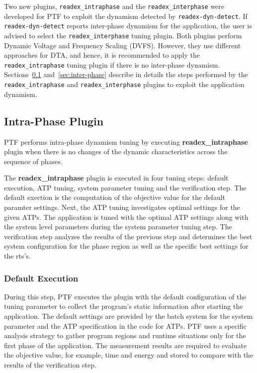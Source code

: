Two new plugins, \texttt{readex\_intraphase} and the \texttt{readex\_interphase} were developed for PTF to exploit the dynamism detected by \texttt{readex-dyn-detect}. If \texttt{readex-dyn-detect} reports inter-phase dynamism for the application, the user is advised to select the \texttt{readex\_interphase} tuning plugin. Both plugins perform Dynamic Voltage and Frequency Scaling (DVFS). However, they use different approaches for DTA, and hence, it is recommended to apply the \texttt{readex\_intraphase} tuning plugin if there is no inter-phase dynamism. Sections~\ref{sec:intra-phase} and~\ref{sec:inter-phase} describe in details the steps performed by the \texttt{readex\_intraphase} and \texttt{readex\_interphase} plugins to exploit the application dynamism.


\subsection{Intra-Phase Plugin} \label{sec:intra-phase}

PTF performs intra-phase dynamism tuning by executing \textbf{readex\_intraphase} plugin when there is no changes of the dynamic characteristics across the sequence of phases.  

The \textbf{readex\_intraphase} plugin is executed in four tuning steps: default execution, ATP tuning, system parameter tuning and the verification step. The default exection is the computation of the objective value for the default paramter settings. Next, the ATP tuning investigates optimal settings for the given ATPs. The application is tuned with the optimal ATP settings along with the system level parameters during the system parameter tuning step. The verification step analyzes the results of the previous step and determines the best system configuration for the phase region as well as the specific best settings for the rts's.

\subsubsection{Default Execution} \label{intra-default-execution} 

During this step, PTF executes the plugin with the default configuration of the tuning parameter to collect the program's static information after starting the application. The default settings are provided by the batch system for the system parameter and the ATP specification in the code for ATPs. PTF uses a specific analysis strategy to gather program regions and runtime situations only for the first phase of the application. The measurement results are required to evaluate the objective value, for example, time and energy and stored to compare with the results of the verification step.

